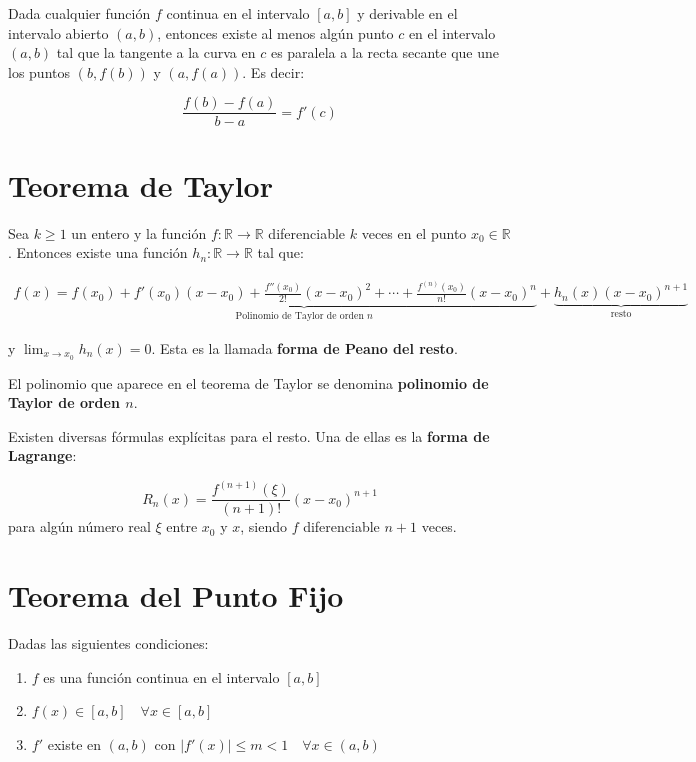 \documentclass[openany]{book}
\providecommand{\tightlist}{%
  \setlength{\itemsep}{0pt}\setlength{\parskip}{0pt}}
\begin{document}
Dada cualquier función \(f\) continua en el intervalo \([a, b]\) y derivable en el intervalo abierto \((a, b)\), entonces existe al menos algún punto \(c\) en el intervalo \((a, b)\) tal que la tangente a la curva en \(c\) es paralela a la recta secante que une los puntos \((b, f(b))\) y \((a, f(a))\). Es decir:

\[
{\displaystyle {\frac {f(b)-f(a)}{b-a}}=f'(c)} 
\]

\hypertarget{teorema-de-taylor}{%
\section*{Teorema de Taylor}\label{teorema-de-taylor}}

Sea \(k \geq 1\) un entero y la función \(f:\mathbb{R} \rightarrow \mathbb{R}\) diferenciable \(k\) veces en el punto \(x_0 \in \mathbb{R}\). Entonces existe una función \(h_n: \mathbb{R} \rightarrow \mathbb{R}\) tal que:

\begin{gather*}
f(x) =
\underbrace{f(x_0) + f'(x_0)(x-x_0) + {\frac{f''(x_0)}{2!}} (x-x_0)^{2} + \cdots + {\frac{f^{(n)}(x_0)}{n!}}(x-x_0)^{n}}_{\text{Polinomio de Taylor de orden $n$}} + 
\underbrace{h_{n}(x)(x-x_0)^{n+1}}_{\text{resto}}
\end{gather*}

y \(\lim_{x \to x_0} h_n(x)=0\). Esta es la llamada \textbf{forma de Peano del resto}.

El polinomio que aparece en el teorema de Taylor se denomina \textbf{polinomio de Taylor de orden \(n\)}.

Existen diversas fórmulas explícitas para el resto. Una de ellas es la \textbf{forma de Lagrange}:

\[ R_{n}(x) = {\frac {f^{(n+1)}(\xi)}{(n+1)!}}(x-x_0)^{n+1} \]
para algún número real \(\xi\) entre \(x_0\) y \(x\), siendo \(f\) diferenciable \(n+1\) veces.

\hypertarget{teorema-del-punto-fijo-1}{%
\section*{Teorema del Punto Fijo}\label{teorema-del-punto-fijo-1}}

Dadas las siguientes condiciones:

\begin{enumerate}
\def\labelenumi{\alph{enumi}.}
\tightlist
\item
  \(f\) es una función continua en el intervalo \([a, b]\)
\item
  \(f(x) \in [a, b] \quad \forall x \in [a, b]\)
\item
  \(f'\) existe en \((a, b)\) con \(|f'(x)| \le m < 1 \quad \forall x \in (a, b)\)
\end{enumerate}
\end{document}
